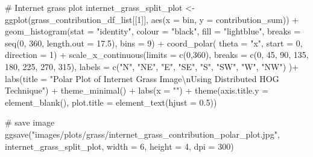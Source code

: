 \documentclass[
  letterpaper,
  DIV=11,
  numbers=noendperiod]{scrreprt}
\newenvironment{Shaded}{\begin{snugshade}}{\end{snugshade}}
\newcommand{\AttributeTok}[1]{\textcolor[rgb]{0.40,0.45,0.13}{#1}}
\newcommand{\CommentTok}[1]{\textcolor[rgb]{0.37,0.37,0.37}{#1}}
\newcommand{\DecValTok}[1]{\textcolor[rgb]{0.68,0.00,0.00}{#1}}
\newcommand{\FloatTok}[1]{\textcolor[rgb]{0.68,0.00,0.00}{#1}}
\newcommand{\FunctionTok}[1]{\textcolor[rgb]{0.28,0.35,0.67}{#1}}
\newcommand{\NormalTok}[1]{\textcolor[rgb]{0.00,0.23,0.31}{#1}}
\newcommand{\OtherTok}[1]{\textcolor[rgb]{0.00,0.23,0.31}{#1}}
\newcommand{\SpecialCharTok}[1]{\textcolor[rgb]{0.37,0.37,0.37}{#1}}
\newcommand{\StringTok}[1]{\textcolor[rgb]{0.13,0.47,0.30}{#1}}
\begin{document}
\begin{Shaded}
\begin{Highlighting}[]
\CommentTok{\# Internet grass plot}
\NormalTok{internet\_grass\_split\_plot }\OtherTok{\textless{}{-}}
  \FunctionTok{ggplot}\NormalTok{(grass\_contribution\_df\_list[[}\DecValTok{1}\NormalTok{]], }
         \FunctionTok{aes}\NormalTok{(}\AttributeTok{x =}\NormalTok{ bin, }\AttributeTok{y =}\NormalTok{ contribution\_sum)) }\SpecialCharTok{+}
  \FunctionTok{geom\_histogram}\NormalTok{(}\AttributeTok{stat =} \StringTok{"identity"}\NormalTok{,}
                 \AttributeTok{colour =} \StringTok{"black"}\NormalTok{, }
                 \AttributeTok{fill =} \StringTok{"lightblue"}\NormalTok{, }
                 \AttributeTok{breaks =} \FunctionTok{seq}\NormalTok{(}\DecValTok{0}\NormalTok{, }\DecValTok{360}\NormalTok{, }\AttributeTok{length.out =} \FloatTok{17.5}\NormalTok{),}
                 \AttributeTok{bins =} \DecValTok{9}\NormalTok{) }\SpecialCharTok{+}
  \FunctionTok{coord\_polar}\NormalTok{(}
    \AttributeTok{theta =} \StringTok{"x"}\NormalTok{, }
    \AttributeTok{start =} \DecValTok{0}\NormalTok{, }
    \AttributeTok{direction =} \DecValTok{1}\NormalTok{) }\SpecialCharTok{+}
  \FunctionTok{scale\_x\_continuous}\NormalTok{(}\AttributeTok{limits =} \FunctionTok{c}\NormalTok{(}\DecValTok{0}\NormalTok{,}\DecValTok{360}\NormalTok{),}
    \AttributeTok{breaks =} \FunctionTok{c}\NormalTok{(}\DecValTok{0}\NormalTok{, }\DecValTok{45}\NormalTok{, }\DecValTok{90}\NormalTok{, }\DecValTok{135}\NormalTok{, }\DecValTok{180}\NormalTok{, }\DecValTok{225}\NormalTok{, }\DecValTok{270}\NormalTok{, }\DecValTok{315}\NormalTok{), }
    \AttributeTok{labels =} \FunctionTok{c}\NormalTok{(}\StringTok{"N"}\NormalTok{, }\StringTok{"NE"}\NormalTok{, }\StringTok{"E"}\NormalTok{, }\StringTok{"SE"}\NormalTok{, }\StringTok{"S"}\NormalTok{, }\StringTok{"SW"}\NormalTok{, }\StringTok{"W"}\NormalTok{, }\StringTok{"NW"}\NormalTok{)}
\NormalTok{  )}\SpecialCharTok{+}
  \FunctionTok{labs}\NormalTok{(}\AttributeTok{title =} \StringTok{"Polar Plot of Internet Grass Image}\SpecialCharTok{\textbackslash{}n}\StringTok{Using Distributed HOG Technique"}\NormalTok{) }\SpecialCharTok{+}
  \FunctionTok{theme\_minimal}\NormalTok{() }\SpecialCharTok{+}
  \FunctionTok{labs}\NormalTok{(}\AttributeTok{x =} \StringTok{""}\NormalTok{) }\SpecialCharTok{+}
  \FunctionTok{theme}\NormalTok{(}\AttributeTok{axis.title.y =} \FunctionTok{element\_blank}\NormalTok{(),}
        \AttributeTok{plot.title =} \FunctionTok{element\_text}\NormalTok{(}\AttributeTok{hjust =} \FloatTok{0.5}\NormalTok{))}

\CommentTok{\# save image}
\FunctionTok{ggsave}\NormalTok{(}\StringTok{"images/plots/grass/internet\_grass\_contribution\_polar\_plot.jpg"}\NormalTok{, internet\_grass\_split\_plot, }\AttributeTok{width =} \DecValTok{6}\NormalTok{, }\AttributeTok{height =} \DecValTok{4}\NormalTok{, }\AttributeTok{dpi =} \DecValTok{300}\NormalTok{)}
\end{Highlighting}
\end{Shaded}
\end{document}
